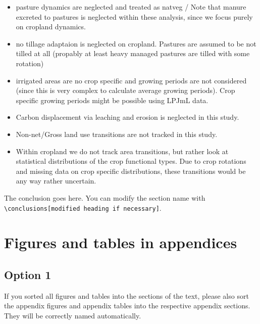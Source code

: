 \documentclass[gc, manuscript]{copernicus}
\begin{document}
\begin{itemize}
\item
  pasture dynamics are neglected and treated as natveg / Note that manure excreted to pastures is neglected within these analysis, since we focus purely on cropland dynamics.
\item
  no tillage adaptaion is neglected on cropland. Pastures are assumed to be not tilled at all (propably at least heavy managed pastures are tilled with some rotation)
\item
  irrigated areas are no crop specific and growing periods are not considered (since this is very complex to calculate average growing periods). Crop specific growing periods might be possible using LPJmL data.
\item
  Carbon displacement via leaching and erosion is neglected in this study.
\item
  Non-net/Gross land use transitions are not tracked in this study.
\item
  Within cropland we do not track area transitions, but rather look at statistical distributions of the crop functional types. Due to crop rotations and missing data on crop specific distributions, these transitions would be any way rather uncertain.
  \newpage
\end{itemize}

\conclusions

The conclusion goes here.
You can modify the section name with \texttt{\textbackslash{}conclusions{[}modified\ heading\ if\ necessary{]}}.
\newpage








\appendix
\section{Figures and tables in appendices}
\subsection{Option 1}

If you sorted all figures and tables into the sections of the text, please also sort the appendix figures and appendix tables into the respective appendix sections.
They will be correctly named automatically.
\end{document}
